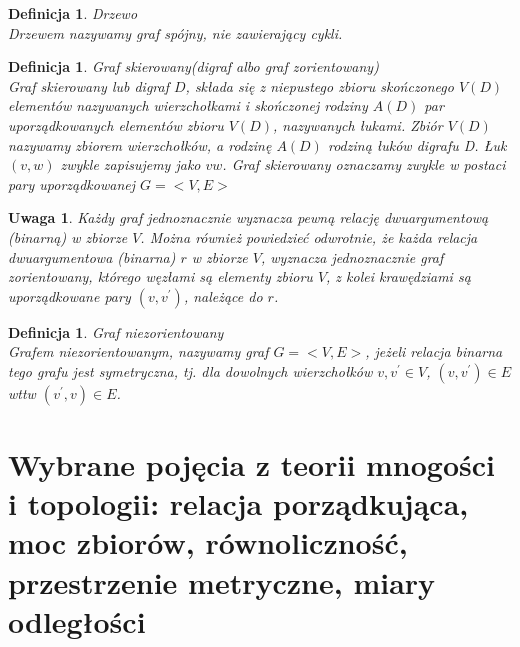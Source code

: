 \documentclass[12pt,a4paper]{report}
\newtheorem{definition}[theorem]{Definicja}
\newtheorem{uwaga}{Uwaga}
\begin{document}

\begin{definition}{Drzewo \cite[Rozdział 4]{wilson2008}\\}
Drzewem nazywamy graf spójny, nie zawierający cykli.\\
\end{definition}

\begin{definition}{Graf skierowany(digraf albo graf zorientowany) \cite[Rozdział 7]{wilson2008}\\}
Graf skierowany lub digraf $D$, składa się z niepustego zbioru skończonego $V(D)$ elementów nazywanych wierzchołkami i skończonej rodziny $A(D)$ par uporządkowanych elementów zbioru $V(D)$, nazywanych łukami. Zbiór $V(D)$ nazywamy zbiorem wierzchołków, a rodzinę $A(D)$ rodziną łuków digrafu D. Łuk $(v,w)$ zwykle zapisujemy jako $vw$. Graf skierowany oznaczamy zwykle w postaci pary uporządkowanej $G=<V,E>$\\
\end{definition}

\begin{uwaga}
Każdy graf jednoznacznie wyznacza pewną relację dwuargumentową (binarną) w zbiorze $V$. Można również powiedzieć odwrotnie, że każda relacja dwuargumentowa (binarna) $r$ w zbiorze $V$, wyznacza jednoznacznie graf zorientowany, którego węzłami są elementy zbioru $V$, z kolei krawędziami są uporządkowane pary $(v,v^{'})$, należące do $r$. 
\end{uwaga}

\begin{definition}{Graf niezorientowany \cite[Rozdział 2.3]{panek2013}\\}
Grafem niezorientowanym, nazywamy graf $G=<V,E>$, jeżeli relacja binarna tego grafu jest symetryczna, tj. dla dowolnych wierzchołków $v,v^{'} \in V$, $(v,v^{'}) \in E$ wttw $(v^{'},v) \in E$.
\end{definition}

\newpage
\section{Wybrane pojęcia z teorii mnogości i topologii: relacja porządkująca, moc zbiorów, równoliczność, przestrzenie metryczne, miary odległości}
\end{document}
